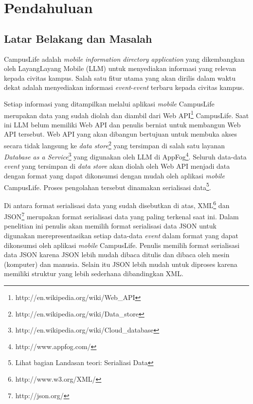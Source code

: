 \documentclass[a4paper, 12pt]{report}
\begin{document}
\chapter{Pendahuluan}
\section{Latar Belakang dan Masalah}
\onehalfspacing CampusLife adalah \textit{mobile information directory application} yang dikembangkan oleh LayangLayang Mobile (LLM) untuk menyediakan informasi yang relevan kepada civitas kampus. Salah satu fitur utama yang akan dirilis dalam waktu dekat adalah menyediakan informasi \textit{event}-\textit{event} terbaru kepada civitas kampus. 

\onehalfspacing Setiap informasi yang ditampilkan melalui aplikasi \textit{mobile} CampusLife merupakan data yang sudah diolah dan diambil dari Web API\footnote{http://en.wikipedia.org/wiki/Web\_API} CampusLife. Saat ini LLM belum memiliki Web API dan penulis berniat untuk membangun Web API tersebut. Web API yang akan dibangun bertujuan untuk membuka akses secara tidak langsung ke \textit{data store}\footnote{http://en.wikipedia.org/wiki/Data\_store} yang tersimpan di salah satu layanan \textit{Database as a Service}\footnote{http://en.wikipedia.org/wiki/Cloud\_database} yang digunakan oleh LLM di AppFog\footnote{http://www.appfog.com/}. Seluruh data-data \textit{event} yang tersimpan di \textit{data store} akan diolah oleh Web API menjadi data dengan format yang dapat dikonsumsi dengan mudah oleh aplikasi \textit{mobile} CampusLife. Proses pengolahan tersebut dinamakan serialisasi data\footnote{Lihat bagian Landasan teori: Serialiasi Data}.

\onehalfspacing Di antara format serialisasi data yang sudah disebutkan di atas, XML\footnote{http://www.w3.org/XML/} dan JSON\footnote{http://json.org/} merupakan format serialisasi data yang paling terkenal saat ini\cite{comparison-of-data-serialization-formats}. Dalam penelitian ini penulis akan memilih format serialisasi data JSON untuk digunakan merepresentasikan setiap data-data \textit{event} dalam format yang dapat dikonsumsi oleh aplikasi \textit{mobile} CampusLife. Penulis memilih format serialisasi data JSON karena JSON lebih mudah dibaca ditulis dan dibaca oleh mesin (komputer) dan manusia. Selain itu JSON lebih mudah untuk diproses karena memiliki struktur yang lebih sederhana dibandingkan XML\cite{json-fat-free}\cite{json-vs-xml-debate}.
\end{document}
